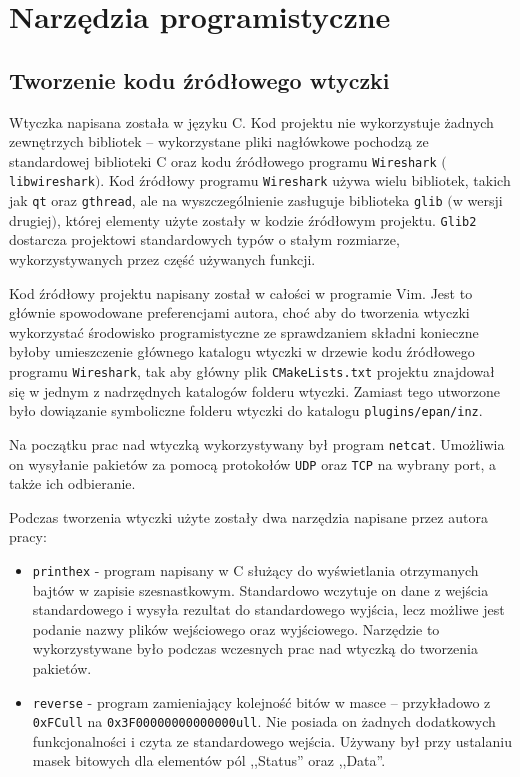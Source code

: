 \documentclass[a4paper, 11pt, twoside, openright]{article}
\begin{document}
\cleardoublepage
\section{Narzędzia programistyczne}

	\subsection{Tworzenie kodu źródłowego wtyczki}

	\indent\par
	Wtyczka napisana została w języku C. Kod projektu nie wykorzystuje żadnych zewnętrzych bibliotek -- wykorzystane pliki nagłówkowe
	pochodzą ze standardowej biblioteki C oraz kodu źródłowego programu \texttt{Wireshark} $($\texttt{libwireshark}$)$.
	Kod źródłowy programu \texttt{Wireshark} używa wielu bibliotek, takich jak \texttt{qt} oraz \texttt{gthread}, ale na wyszczególnienie
	zasługuje biblioteka \texttt{glib} $($w wersji drugiej$)$, której
	elementy użyte zostały w kodzie źródłowym projektu. \texttt{Glib2} dostarcza projektowi standardowych typów o stałym
	rozmiarze, wykorzystywanych przez część używanych funkcji.

	Kod źródłowy projektu napisany został w całości w programie Vim. Jest to głównie spowodowane preferencjami autora,
	choć aby do tworzenia wtyczki wykorzystać środowisko programistyczne ze sprawdzaniem składni konieczne byłoby umieszczenie
	głównego katalogu wtyczki w drzewie kodu źródłowego programu \texttt{Wireshark}, tak aby główny plik \texttt{CMakeLists.txt} projektu znajdował się w jednym
	z nadrzędnych katalogów folderu wtyczki. Zamiast tego utworzone było dowiązanie symboliczne folderu wtyczki do katalogu
	\texttt{plugins/epan/inz}.

	Na początku prac nad wtyczką wykorzystywany był program \texttt{netcat}. Umożliwia on wysyłanie pakietów
	za pomocą protokołów \texttt{UDP} oraz \texttt{TCP} na wybrany port, a także ich odbieranie.

	Podczas tworzenia wtyczki użyte zostały dwa narzędzia napisane przez autora pracy:
	\begin{itemize}
		\item \texttt{printhex} - program napisany w C służący do wyświetlania otrzymanych bajtów w zapisie szesnastkowym. Standardowo
			wczytuje on dane z wejścia standardowego i wysyła rezultat do standardowego wyjścia, lecz możliwe jest podanie nazwy plików
			wejściowego oraz wyjściowego. Narzędzie to wykorzystywane było podczas wczesnych prac nad wtyczką do tworzenia pakietów.
		\item \texttt{reverse} - program zamieniający kolejność bitów w masce -- przykładowo z \texttt{0xFCull} na \texttt{0x3F00000000000000ull}.
			Nie posiada on żadnych dodatkowych funkcjonalności i czyta ze standardowego wejścia. Używany był przy ustalaniu masek bitowych dla
			elementów pól ,,Status'' oraz ,,Data''.
	\end{itemize}
\end{document}

